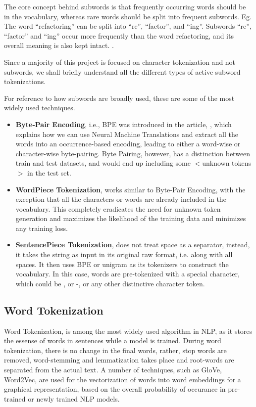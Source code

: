 The core concept behind subwords is that frequently occurring words should be in the vocabulary, whereas rare words should be split into frequent subwords. Eg. The word “refactoring” can be split into “re”, “factor”, and “ing”. Subwords “re”, “factor” and “ing” occur more frequently than the word refactoring, and its overall meaning is also kept intact. \textcite{subwords_tokenization}. 

Since a majority of this project is focused on character tokenization and not subwords, we shall briefly understand all the different types of active subword tokenizations.

For reference to how subwords are broadly used, these are some of the most widely used techniques.

\begin{itemize}
    \item \textbf{Byte-Pair Encoding}, i.e., BPE was introduced in the article, \textcite{DBLP:journals/corr/SennrichHB15}, which explains how we can use Neural Machine Translations and extract all the words into an occurrence-based encoding, leading to either a word-wise or character-wise byte-pairing. Byte Pairing, however, has a distinction between train and test datasets, and would end up including some $<$unknown tokens$>$ in the test set.
    \item \textbf{WordPiece Tokenization}, works similar to Byte-Pair Encoding, with the exception that all the characters or words are already included in the vocabulary. This completely eradicates the need for unknown token generation and maximizes the likelihood of the training data and minimizes any training loss.
    \item \textbf{SentencePiece Tokenization}, does not treat space as a separator, instead, it takes the string as input in its original raw format, i.e. along with all spaces. It then uses BPE or unigram as its tokenizers to construct the vocabulary. In this case, words are pre-tokenized with a special character, which could be \textunderscore , or -, or any other distinctive character token.
\end{itemize}

\subsection{Word Tokenization}
\label{sec:token_words}

Word Tokenization, is among the most widely used algorithm in NLP, as it stores the essense of words in sentences while a model is trained. During word tokenization, there is no change in the final words, rather, stop words are removed, word-stemming and lemmatization takes place and root-words are separated from the actual text. A number of techniques, such as GloVe, Word2Vec, are used for the vectorization of words into word embeddings for a graphical representation, based on the overall probability of occurance in pre-trained or newly trained NLP models.

